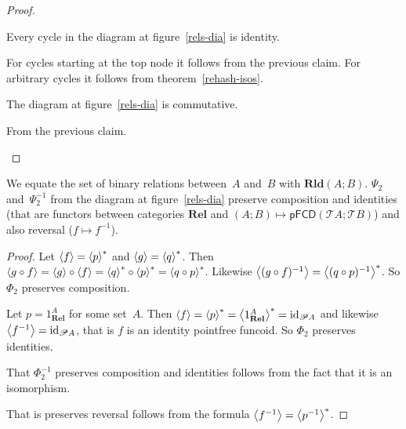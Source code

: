 \begin{proof}
\begin{claim}
Every cycle in the diagram at figure~\ref{rels-dia} is identity.
\end{claim}
\begin{claimproof}
For cycles starting at the top node it follows from the previous claim.
For arbitrary cycles it follows from theorem~\ref{rehash-isos}.
\end{claimproof}

\begin{claim}
The diagram at figure~\ref{rels-dia} is commutative.
\end{claim}
\begin{claimproof}
From the previous claim.
\end{claimproof}

\end{proof}

\begin{prop}
We equate the set of binary relations between~$A$ and~$B$ with $\mathbf{Rld}(A;B)$.
$\Psi_2$ and~$\Psi_2^{-1}$ from the diagram at figure~\ref{rels-dia} preserve composition and identities (that are functors
between categories $\mathbf{Rel}$ and $(A;B)\mapsto\mathsf{pFCD}(\mathscr{T}A;\mathscr{T}B)$) and also reversal ($f\mapsto f^{-1}$).
\end{prop}

\begin{proof}
Let $\left\langle f\right\rangle=\left\langle p\right\rangle ^{\ast}$ and $\left\langle g\right\rangle=\left\langle q\right\rangle ^{\ast}$. Then $\left\langle g\circ f\right\rangle=\left\langle g\right\rangle\circ\left\langle f\right\rangle=\left\langle q\right\rangle ^{\ast}\circ\left\langle p\right\rangle ^{\ast}=\left\langle q\circ p\right\rangle ^{\ast}$.
Likewise $\left\langle (g\circ f)^{-1}\right\rangle=\left\langle (q\circ p)^{-1}\right\rangle ^{\ast}$. So
$\Phi_2$ preserves composition.

Let $p=1_{\mathbf{Rel}}^{A}$ for some set~$A$. Then $\left\langle f\right\rangle=\left\langle p\right\rangle ^{\ast}=\left\langle 1_{\mathbf{Rel}}^{A}\right\rangle ^{\ast}=\operatorname{id}_{\mathscr{P} A}$
and likewise $\left\langle f^{-1}\right\rangle=\operatorname{id}_{\mathscr{P} A}$, that is $f$ is
an identity pointfree funcoid. So $\Phi_2$ preserves identities.

That $\Phi_2^{-1}$ preserves composition and identities follows from the fact that it is an isomorphism.

That is preserves reversal follows from the formula $\left\langle f^{-1}\right\rangle=\left\langle p^{-1}\right\rangle ^{\ast}$.
\end{proof}

